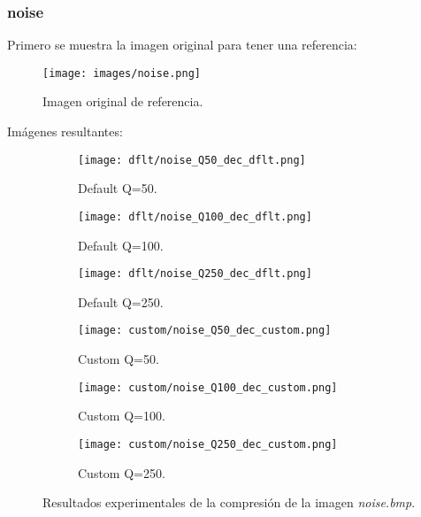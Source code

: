 \documentclass[12pt,a4paper]{article}
\begin{document}
\subsubsection{noise}
Primero se muestra la imagen original para tener una referencia:
\begin{figure}[H]
    \centering
    \texttt{[image: images/noise.png]}
    \caption[Referencia - noise]{Imagen original de referencia.}
    
\end{figure}
    
    \vspace{0.5cm}

Imágenes resultantes:
\begin{figure}   [H]
    \begin{subfigure}{0.30\textwidth}
        \centering
        \texttt{[image: dflt/noise\_Q50\_dec\_dflt.png]}
        \caption{Default Q=50.}
        
    \end{subfigure}
    \hfill
    \begin{subfigure}{0.30\textwidth}
        \centering
        \texttt{[image: dflt/noise\_Q100\_dec\_dflt.png]}
        \caption{Default Q=100.}
        
    \end{subfigure}
    \hfill
    \begin{subfigure}{0.30\textwidth}
        \centering
        \texttt{[image: dflt/noise\_Q250\_dec\_dflt.png]}
        \caption{Default Q=250.}
        
    \end{subfigure}
    
    \vspace{0.5cm}
    
    \begin{subfigure}{0.30\textwidth}
        \centering
        \texttt{[image: custom/noise\_Q50\_dec\_custom.png]}
        \caption{Custom Q=50.}
        
    \end{subfigure}
    \hfill
    \begin{subfigure}{0.30\textwidth}
        \centering
        \texttt{[image: custom/noise\_Q100\_dec\_custom.png]}
        \caption{Custom Q=100.}
        
    \end{subfigure}
    \hfill
    \begin{subfigure}{0.30\textwidth}
        \centering
        \texttt{[image: custom/noise\_Q250\_dec\_custom.png]}
        \caption{Custom Q=250.}
        
    \end{subfigure}
    
    \caption[Resultados experimentales - noise]{Resultados experimentales de la compresión de la imagen \textit{noise.bmp}.}
    
\end{figure}
\end{document}
